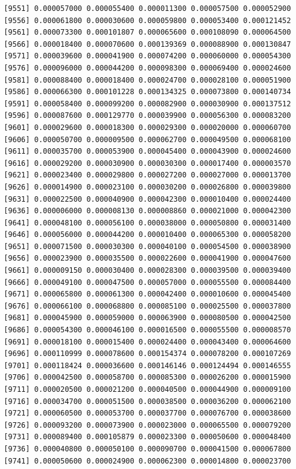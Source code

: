 \documentclass[]{article}
\begin{document}
\begin{verbatim}
 [9551] 0.000057000 0.000055400 0.000011300 0.000057500 0.000052900
 [9556] 0.000061800 0.000030600 0.000059800 0.000053400 0.000121452
 [9561] 0.000073300 0.000101807 0.000065600 0.000108090 0.000064500
 [9566] 0.000018400 0.000070600 0.000139369 0.000088900 0.000130847
 [9571] 0.000039600 0.000041900 0.000074200 0.000060000 0.000054300
 [9576] 0.000096000 0.000044200 0.000098300 0.000069400 0.000024600
 [9581] 0.000088400 0.000018400 0.000024700 0.000028100 0.000051900
 [9586] 0.000066300 0.000101228 0.000134325 0.000073800 0.000140734
 [9591] 0.000058400 0.000099200 0.000082900 0.000030900 0.000137512
 [9596] 0.000087600 0.000129770 0.000039900 0.000056300 0.000083200
 [9601] 0.000029600 0.000018300 0.000029300 0.000020000 0.000060700
 [9606] 0.000050700 0.000009500 0.000062700 0.000049500 0.000068100
 [9611] 0.000035700 0.000053900 0.000045400 0.000043900 0.000024600
 [9616] 0.000029200 0.000030900 0.000030300 0.000017400 0.000003570
 [9621] 0.000023400 0.000029800 0.000027200 0.000027000 0.000013700
 [9626] 0.000014900 0.000023100 0.000030200 0.000026800 0.000039800
 [9631] 0.000022500 0.000040900 0.000042300 0.000010400 0.000024400
 [9636] 0.000006000 0.000008130 0.000008860 0.000021000 0.000042300
 [9641] 0.000048100 0.000056100 0.000038000 0.000050800 0.000031400
 [9646] 0.000056000 0.000044200 0.000010400 0.000065300 0.000058200
 [9651] 0.000071500 0.000030300 0.000040100 0.000054500 0.000038900
 [9656] 0.000023900 0.000035500 0.000022600 0.000041900 0.000047600
 [9661] 0.000009150 0.000030400 0.000028300 0.000039500 0.000039400
 [9666] 0.000049100 0.000047500 0.000057000 0.000055500 0.000084400
 [9671] 0.000065800 0.000061300 0.000042400 0.000010600 0.000045400
 [9676] 0.000066100 0.000068800 0.000085100 0.000025500 0.000037800
 [9681] 0.000045900 0.000059000 0.000063900 0.000080500 0.000042500
 [9686] 0.000054300 0.000046100 0.000016500 0.000055500 0.000008570
 [9691] 0.000018100 0.000015400 0.000024400 0.000043400 0.000064600
 [9696] 0.000110999 0.000078600 0.000154374 0.000078200 0.000107269
 [9701] 0.000118424 0.000036600 0.000146146 0.000124494 0.000146555
 [9706] 0.000042500 0.000058700 0.000085300 0.000026200 0.000015900
 [9711] 0.000020500 0.000021200 0.000040500 0.000044900 0.000009100
 [9716] 0.000034700 0.000051500 0.000038500 0.000036200 0.000062100
 [9721] 0.000060500 0.000053700 0.000037700 0.000076700 0.000038600
 [9726] 0.000093200 0.000073900 0.000023000 0.000065500 0.000079200
 [9731] 0.000089400 0.000105879 0.000023300 0.000050600 0.000048400
 [9736] 0.000040800 0.000050100 0.000090700 0.000041500 0.000067800
 [9741] 0.000050600 0.000024900 0.000062300 0.000014800 0.000023700

\end{verbatim}
\end{document}
